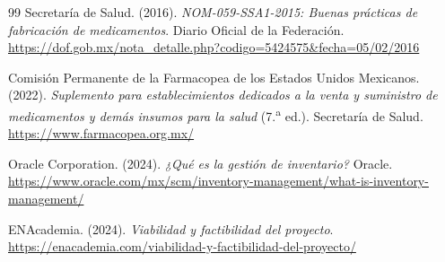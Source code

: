 \begin{thebibliography}{99}
    Secretaría de Salud. (2016). \textit{NOM-059-SSA1-2015: Buenas prácticas de fabricación
    de medicamentos}. Diario Oficial de la Federación.
    \url{https://dof.gob.mx/nota_detalle.php?codigo=5424575&fecha=05/02/2016}

    Comisión Permanente de la Farmacopea de los Estados Unidos Mexicanos. (2022).
    \textit{Suplemento para establecimientos dedicados a la venta y suministro de
    medicamentos y demás insumos para la salud} (7.\textsuperscript{a} ed.). Secretaría de Salud.
    \url{https://www.farmacopea.org.mx/}


    Oracle Corporation. (2024). \textit{¿Qué es la gestión de inventario?} Oracle.
    \url{https://www.oracle.com/mx/scm/inventory-management/what-is-inventory-management/}

    ENAcademia. (2024). \textit{Viabilidad y factibilidad del proyecto}.
    \url{https://enacademia.com/viabilidad-y-factibilidad-del-proyecto/}

\end{thebibliography}
\clearpage
